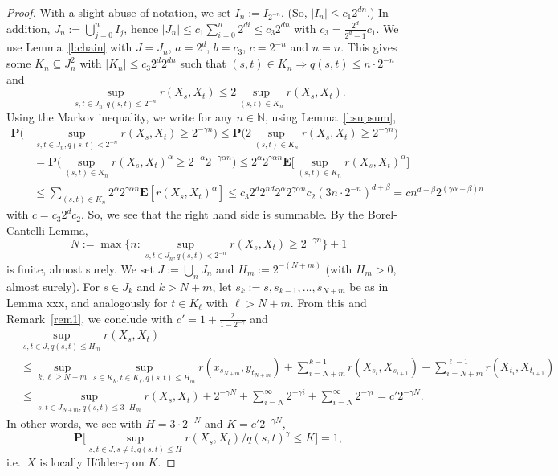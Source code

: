 \documentclass{article}
\theoremstyle{definition}
\theoremstyle{step} \newtheorem{step}{Step}
\begin{document}
\begin{proof}
  With a slight abuse of notation, we set $I_n := I_{2^{-n}}$. (So, $|I_n| \leq c_1 2^{dn}$.) In addition, $J_n := \bigcup_{j=0}^n I_j$, hence $|J_n| \leq c_1 \sum_{i=0}^n 2^{di} \leq c_3 2^{dn}$ with $c_3 = \frac{2^d}{2^d-1}c_1$. We use Lemma~\ref{l:chain} with $J = J_n$, $a = 2^d$, $b = c_3$, $c = 2^{-n}$ and $n=n$. This gives some $K_n \subseteq J_n^2$ with $|K_n| \leq c_3 2^d 2^{dn}$ such that $(s,t) \in K_n \Rightarrow q(s,t) \leq n\cdot 2^{-n}$ and
  $$\sup_{s,t \in J_n, q(s,t) \leq 2^{-n}} r(X_s, X_t) \leq 2 \sup_{(s,t) \in K_n}  r(X_s, X_t).$$
  Using the Markov inequality, we write for any $n\in\mathbb N$, using Lemma~\ref{l:supsum},
  \begin{align*}
    \mathbf P\Big( & \sup_{s,t\in J_n, q(s,t) < 2^{-n}} r(X_s, X_t)
    \geq 2^{-\gamma n} \Big) \leq
    \mathbf P\Big( 2\sup_{(s,t)\in K_n} r(X_s, X_t)
    \geq 2^{-\gamma n} \Big)                                               \\ & = \mathbf P\Big( \sup_{(s,t)\in K_n} r(X_s, X_t)^\alpha
    \geq 2^{-\alpha} 2^{-\gamma \alpha n} \Big) \leq 2^\alpha 2^{\gamma \alpha n}\mathbf
    E\Big[\sup_{(s,t) \in K_n} r(X_s, X_t)^\alpha \Big]
    \\ & \leq \sum_{(s,t)\in K_n} 2^\alpha 2^{\gamma\alpha
        n}\mathbf E[r(X_s,X_t)^\alpha] \leq c_3 2^d 2^{nd} 2^\alpha 2^{\gamma\alpha n}
    c_2 (3n\cdot 2^{-n})^{d + \beta} = c n^{d + \beta} 2^{(\gamma\alpha - \beta)n}
  \end{align*}
  with $c = c_3 2^d c_2$. So, we see that the right hand side is summable. By the
  Borel-Cantelli Lemma,
  $$ N := \max \Big\{n: \sup_{s,t\in J_n, q(s,t) < 2^{-n}} r(X_s, X_t)
    \geq 2^{-\gamma n}\Big\} + 1$$
  is finite, almost surely. We set $J := \bigcup_n J_n$ and $H_m := 2^{-(N+m)}$ (with $H_m>0$, almost surely). For $s\in J_k$ and $k>N+m$, let $s_k := s, s_{k-1},...,s_{N+m}$ be as in Lemma xxx, and analogously for $t\in K_\ell$ with $\ell > N+m$. From this and Remark~\ref{rem1}, we conclude with $c' = 1 + \frac{2}{1-2^{-\gamma}}$ and
  \begin{align*}
    & \sup_{s,t\in J, q(s,t) \leq H_m} r(X_s, X_t)
    \\ & \leq
    \sup_{k, \ell \geq N+m} \sup_{s \in K_k, t\in K_\ell, q(s,t) \leq H_m} r(x_{s_{N+m}}, y_{t_{N+m}}) + \sum_{i=N+m}^{k-1} r(X_{s_i}, X_{s_{i+1}}) +
    \sum_{i=N+m}^{\ell-1} r(X_{t_i}, X_{t_{i+1}})    \\ &
    \leq \sup_{s,t \in J_{N+m}, q(s,t) \leq 3\cdot H_m} r(X_s, X_t) +  2^{-\gamma N} + \sum_{i=N}^\infty 2^{-\gamma i} + \sum_{i=N}^\infty 2^{-\gamma i}
    = c' 2^{-\gamma N}.
  \end{align*}
  In other words, we see with $H = 3\cdot 2^{-N}$ and $K = c' 2^{-\gamma N}$,
  $$ \mathbf P\Big[\sup_{s,t\in J, s\neq t, q(s,t) \leq H} r(X_s,
      X_t)/q(s,t)^\gamma \leq K\Big] = 1,
  $$
  i.e.\ $X$ is locally Hölder-$\gamma$ on $K$.


\end{proof}
\end{document}
